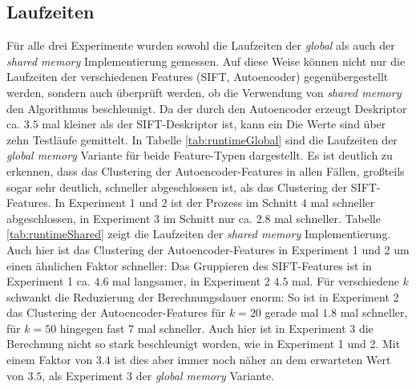 \subsection{Laufzeiten}

Für alle drei Experimente wurden sowohl die Laufzeiten der \textit{global} als auch der \textit{shared memory} Implementierung gemessen. Auf diese Weise können nicht nur die Laufzeiten der verschiedenen Features (SIFT, Autoencoder) gegenübergestellt werden, sondern auch überprüft werden, ob die Verwendung von \textit{shared memory} den Algorithmus beschleunigt. Da der durch den Autoencoder erzeugt Deskriptor ca. $3.5$ mal kleiner als der SIFT-Deskriptor ist, kann ein  Die Werte sind über zehn Testläufe gemittelt. \newline
In Tabelle \ref{tab:runtimeGlobal} sind die Laufzeiten der \textit{global memory} Variante für beide Feature-Typen dargestellt. Es ist deutlich zu erkennen, dass das Clustering der Autoencoder-Features in allen Fällen, großteils sogar sehr deutlich, schneller abgeschlossen ist, als das Clustering der SIFT-Features. In Experiment 1 und 2 ist der Prozess im Schnitt $4$ mal schneller abgeschlossen, in Experiment 3 im Schnitt nur ca. $2.8$ mal schneller.\newline
Tabelle \ref{tab:runtimeShared} zeigt die Laufzeiten der \textit{shared memory} Implementierung. Auch hier ist das Clustering der Autoencoder-Features in Experiment 1 und 2 um einen ähnlichen Faktor schneller: Das Gruppieren des SIFT-Features ist in Experiment 1 ca. $4.6$ mal langsamer, in Experiment 2 $4.5$ mal. Für verschiedene $k$ schwankt die Reduzierung der Berechnungsdauer enorm: So ist in Experiment 2 das Clustering der Autoencoder-Features für $k=20$ gerade mal $1.8$ mal schneller, für $k=50$ hingegen fast $7$ mal schneller. Auch hier ist in Experiment 3 die Berechnung nicht so stark beschleunigt worden, wie in Experiment 1 und 2. Mit einem Faktor von $3.4$ ist dies aber immer noch näher an dem erwarteten Wert von $3.5$, als Experiment 3 der \textit{global memory} Variante.

